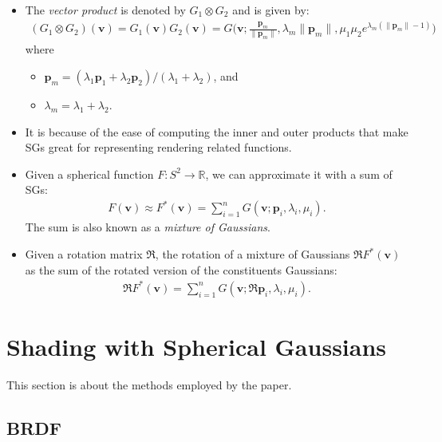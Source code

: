 \documentclass[10pt]{article}
\newcommand{\ve}[1]{\mathbf{#1}}
\newcommand{\ra}{\rightarrow}
\newcommand{\Real}{\mathbb{R}}
\begin{document}
\begin{itemize}
  	\item The \emph{vector product} is denoted by $G_1 \otimes G_2$ and is given by:
  	\begin{align*}
  		(G_1 \otimes G_2)(\ve{v}) = G_1(\ve{v}) G_2(\ve{v}) = G\bigg(\ve{v}; \frac{\ve{p}_m}{\| \ve{p}_m \|}, \lambda_m \| \ve{p}_m \|, \mu_1\mu_2 e^{\lambda_m (\| \ve{p}_m \|-1)} \bigg)
  	\end{align*}
  	where
  	\begin{itemize}
  		\item $\ve{p}_m = (\lambda_1 \ve{p}_1 + \lambda_2 \ve{p}_2) / (\lambda_1 + \lambda_2) $, and
  		\item $\lambda_m = \lambda_1 + \lambda_2$.
  	\end{itemize}

  	\item It is because of the ease of computing the inner and outer products that make SGs great for representing rendering related functions.

  	\item Given a spherical function $F: S^2 \ra \Real$, we can approximate it with a sum of SGs:
  	\begin{align*}
  		F(\ve{v}) \approx F^*(\ve{v}) = \sum_{i=1}^n G(\ve{v}; \ve{p}_i, \lambda_i, \mu_i).
  	\end{align*}
    The sum is also known as a \emph{mixture of Gaussians}.

    \item Given a rotation matrix $\mathfrak{R}$, the rotation of a mixture of Gaussians $\mathfrak{R}F^*(\ve{v})$ as the sum of the rotated version of the constituents Gaussians:
    \begin{align*}
      \mathfrak{R}F^*(\ve{v}) = \sum_{i=1}^n G(\ve{v}; \mathfrak{R}\ve{p}_i, \lambda_i, \mu_i).
    \end{align*}
  \end{itemize}

  \section{Shading with Spherical Gaussians}

  This section is about the methods employed by the \cite{Wang:2009} paper.

  \subsection{BRDF}
\end{document}
